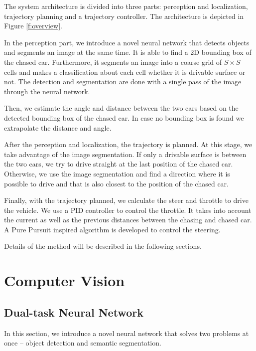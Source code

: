 \documentclass{ctuthesis/ctuthesis}
\begin{document}
The system architecture is divided into three parts: perception and localization, trajectory planning and a trajectory controller. The architecture is depicted in Figure \ref{f:overview}. \par


In the perception part, we introduce a novel neural network that detects objects and segments an image at the same time. It is able to find a 2D bounding box of the chased car. Furthermore, it segments an image into a coarse grid of $S\times S$ cells and makes a classification about each cell whether it is drivable surface or not. The detection and segmentation are done with a single pass of the image through the neural network. \par


Then, we estimate the angle and distance between the two cars based on the detected bounding box of the chased car. In case no bounding box is found we extrapolate the distance and angle. \par


After the perception and localization, the trajectory is planned. At this stage, we take advantage of the image segmentation. If only a drivable surface is between the two cars, we try to drive straight at the last position of the chased car. Otherwise, we use the image segmentation and find a direction where it is possible to drive and that is also closest to the position of the chased car. \par


Finally, with the trajectory planned, we calculate the steer and throttle to drive the vehicle. We use a PID controller \cite{PID_orig} to control the throttle. It takes into account the current as well as the previous distances between the chasing and chased car. A Pure Pursuit \cite{pure_pursuit_orig} inspired algorithm is developed to control the steering. \par

Details of the method will be described in the following sections.




\section{Computer Vision}
\subsection{Dual-task Neural Network}
In this section, we introduce a novel neural network that solves two problems at once -- object detection and semantic segmentation. \par
\end{document}
